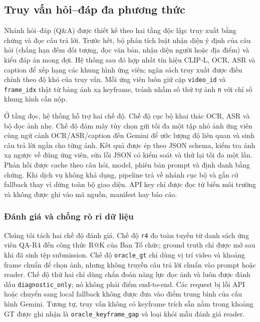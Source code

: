 
\subsection{Truy vấn hỏi--đáp đa phương thức}

Nhánh hỏi--đáp (Q\&A) được thiết kế theo hai tầng độc lập: truy xuất bằng chứng
và đọc câu trả lời. Trước hết, bộ phân tích luật nhận diện ý định của câu hỏi
(chẳng hạn đếm đối tượng, đọc văn bản, nhận diện người hoặc địa điểm) và kiểu
đáp án mong đợi. Hệ thống sau đó hợp nhất tín hiệu CLIP-L, OCR, ASR và caption
để xếp hạng các khung hình ứng viên; ngân sách truy xuất được điều chỉnh theo
độ khó của truy vấn. Mỗi ứng viên luôn giữ cặp \texttt{video\_id} và
\texttt{frame\_idx} thật từ bảng ánh xạ keyframe, tránh nhầm số thứ tự ảnh
\texttt{n} với chỉ số khung hình cần nộp.

Ở tầng đọc, hệ thống hỗ trợ hai chế độ. Chế độ cục bộ khai thác OCR, ASR và bộ
đọc ảnh nhẹ. Chế độ đám mây tùy chọn gửi tối đa một tập nhỏ ảnh ứng viên cùng
ngữ cảnh OCR/ASR/caption đến Gemini để ước lượng độ liên quan và sinh câu trả
lời ngắn cho từng ảnh. Kết quả được ép theo JSON schema, kiểm tra ánh xạ ngược
về đúng ứng viên, sửa lỗi JSON có kiểm soát và thử lại tối đa một lần. Phản hồi
được cache theo câu hỏi, model, phiên bản prompt và định danh bằng chứng. Khi
dịch vụ không khả dụng, pipeline trả về nhánh cục bộ và gắn cờ fallback thay vì
dừng toàn bộ giao diện. API key chỉ được đọc từ biến môi trường và không được
ghi vào mã nguồn, manifest hay báo cáo.

\subsubsection{Đánh giá và chống rò rỉ dữ liệu}

Chúng tôi tách hai chế độ đánh giá. Chế độ \texttt{r4} đo toàn tuyến từ danh
sách ứng viên QA-R4 đến công thức R@K của Ban Tổ chức; ground truth chỉ được mở
sau khi đã sinh tệp submission. Chế độ \texttt{oracle\_gt} chỉ dùng vị trí
video và khoảng frame chuẩn để chọn ảnh, nhưng không truyền câu trả lời chuẩn
vào prompt hoặc reader. Chế độ thứ hai chỉ dùng chẩn đoán năng lực đọc ảnh và
luôn được đánh dấu \texttt{diagnostic\_only}; nó không phải điểm end-to-end.
Các request bị lỗi API hoặc chuyển sang local fallback không được đưa vào điểm
trung bình của cấu hình Gemini. Tương tự, truy vấn không có keyframe trích sẵn
nằm trong khoảng GT được ghi nhận là \texttt{oracle\_keyframe\_gap} và loại
khỏi mẫu đánh giá reader.

